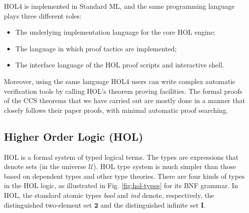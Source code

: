 HOL4 is implemented in Standard ML, and
 the same programming language
plays three different roles:
\begin{itemize}
\item The underlying implementation language for the core HOL engine;
\item The language in which proof tactics are implemented;
\item The interface language of the HOL proof scripts and interactive shell.
\end{itemize}
Moreover, using the same language HOL4 users can write complex automatic
verification tools by calling HOL's theorem proving
facilities. The formal proofs of the CCS theorems that we have carried
out 
are mostly done in a manner that closely follows
their paper proofs, with minimal automatic proof searching.

\subsection{Higher Order Logic (HOL)}

HOL is a formal system of typed logical terms. The types are expressions that denote sets (in the
universe $\mathcal{U}$). HOL type system is much simpler than those
based on dependent types and other type theories. There are four kinds of types in the HOL
logic, as illustrated in Fig. \ref{fig:hol-types} for its BNF
grammar. In HOL, the standard atomic types \emph{bool} and \emph{ind}
 denote, respectively, the distinguished two-element set $\mathbf{2}$ and the
distinguished infinite set $\mathbf{I}$.

\newlength{\ttX}
\settowidth{\ttX}{\tt X}
\newcommand{\tyvar}{\setlength{\unitlength}{\ttX}\begin{picture}(1,6)
\put(.5,0){\makebox(0,0)[b]{\footnotesize type variables}}
\put(0,1.5){\vector(0,1){4.5}}
\end{picture}}
\newcommand{\tyatom}{\setlength{\unitlength}{\ttX}\begin{picture}(1,6)
\put(.5,2.3){\makebox(0,0)[b]{\footnotesize atomic types}}
\put(.5,3.3){\vector(0,1){2.6}}
\end{picture}}
\newcommand{\funty}{\setlength{\unitlength}{\ttX}\begin{picture}(1,6)
\put(.5,1.5){\makebox(0,0)[b]{\footnotesize function types}}
\put(.5,0){\makebox(0,0)[b]{\footnotesize (domain $\sigma_1$, codomain $\sigma_2$)}}
\put(1,2.5){\vector(0,1){3.5}}
\end{picture}}
\newcommand{\cmpty}{\setlength{\unitlength}{\ttX}\begin{picture}(1,6)
\put(2,3.3){\makebox(0,0)[b]{\footnotesize compound types}}
\put(1.9,4.5){\vector(0,1){1.5}}
\end{picture}}

